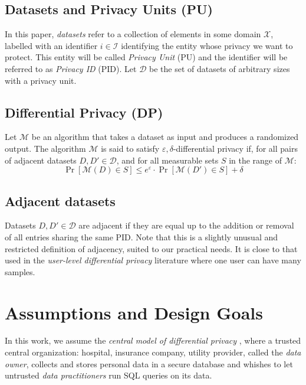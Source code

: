 \documentclass{article}
\begin{document}
    \subsection*{Datasets and Privacy Units (PU)}
    
    In this paper, \emph{datasets} refer to a collection of elements in some domain $\mathcal{X}$, labelled with an identifier $i\in \mathcal{I}$ identifying the entity whose privacy we want to protect. This entity will be called \emph{Privacy Unit} (PU) and the identifier will be referred to as \emph{Privacy ID} (PID). Let $\mathcal{D}$ be the set of datasets of arbitrary sizes with a privacy unit.
    
    \subsection*{Differential Privacy (DP)}
    
    Let $\mathcal{M}$ be an algorithm that takes a dataset as input and produces a randomized output. The algorithm $\mathcal{M}$ is said to satisfy $\varepsilon,\delta$-differential privacy if, for all pairs of adjacent datasets $D, D' \in \mathcal{D}$, and for all measurable sets $S$ in the range of $\mathcal{M}$:
    $$\Pr[\mathcal{M}(D) \in S] \leq e^{\varepsilon} \cdot \Pr[\mathcal{M}(D') \in S] + \delta$$
    
    \subsection*{Adjacent datasets}
    
    Datasets $D, D' \in \mathcal{D}$ are adjacent if they are equal up to the addition or removal of all entries sharing the same PID. Note that this is a slightly unusual and restricted definition of adjacency, suited to our practical needs. It is close to that used in the \emph{user-level differential privacy} literature \cite{liu2020learning, wilson2019differentially} where one user can have many samples.
    
    \section{Assumptions and Design Goals}
    
    In this work, we assume the \emph{central model of differential privacy} \cite{near2020threat}, where a trusted central organization: hospital, insurance company, utility provider, called the \emph{data owner}, collects and stores personal data in a secure database and whishes to let untrusted \emph{data practitioners} run SQL queries on its data.
    
\end{document}
